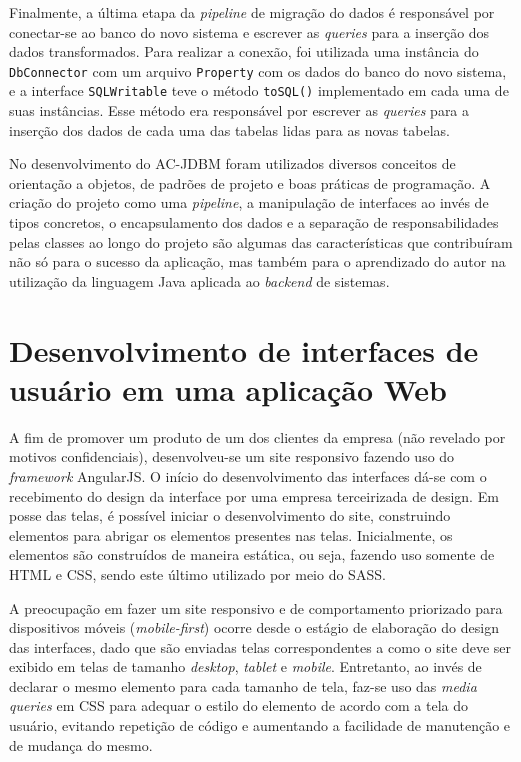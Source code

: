 Finalmente, a última etapa da \textit{pipeline} de migração do dados é responsável por conectar-se ao banco do novo sistema e escrever as \textit{queries} para a inserção dos dados transformados. Para realizar a conexão, foi utilizada uma instância do \verb|DbConnector| com um arquivo \verb|Property| com os dados do banco do novo sistema, e a interface \verb|SQLWritable| teve o método \verb|toSQL()| implementado em cada uma de suas instâncias. Esse método era responsável por escrever as \textit{queries} para a inserção dos dados de cada uma das tabelas lidas para as novas tabelas.

No desenvolvimento do AC-JDBM foram utilizados diversos conceitos de orientação a objetos, de padrões de projeto e boas práticas de programação.  A criação do projeto como uma \textit{pipeline}, a manipulação de interfaces ao invés de tipos concretos, o encapsulamento dos dados e a separação de responsabilidades pelas classes ao longo do projeto são algumas das características que contribuíram não só para o sucesso da aplicação, mas também para o aprendizado do autor na utilização da linguagem Java aplicada ao \textit{backend} de sistemas.

\section{Desenvolvimento de interfaces de usuário em uma aplicação Web}
\label{sec:ui-atividades}

A fim de promover um produto de um dos clientes da empresa (não revelado por motivos confidenciais), desenvolveu-se um site responsivo fazendo uso do \textit{framework} AngularJS. O início do desenvolvimento das interfaces dá-se com o recebimento do design da interface por uma empresa terceirizada de design. Em posse das telas, é possível iniciar o desenvolvimento do site, construindo elementos para abrigar os elementos presentes nas telas. Inicialmente, os elementos são construídos de maneira estática, ou seja, fazendo uso somente de HTML e CSS, sendo este último utilizado por meio do SASS.

A preocupação em fazer um site responsivo e de comportamento priorizado para dispositivos móveis (\textit{mobile-first}) ocorre desde o estágio de elaboração do design das interfaces, dado que são enviadas telas correspondentes a como o site deve ser exibido em telas de tamanho \textit{desktop}, \textit{tablet} e \textit{mobile}. Entretanto, ao invés de declarar o mesmo elemento para cada tamanho de tela, faz-se uso das \textit{media queries} em CSS para adequar o estilo do elemento de acordo com a tela do usuário, evitando repetição de código e aumentando a facilidade de manutenção e de mudança do mesmo.

